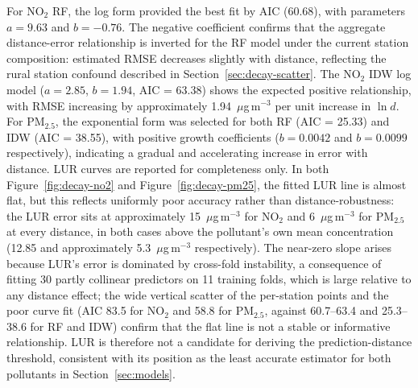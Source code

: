 \documentclass[11pt,a4paper]{article}
\begin{document}
For NO$_2$ RF, the log form provided the best fit by AIC (60.68), with parameters $a = 9.63$ and $b = -0.76$. The negative coefficient confirms that the aggregate distance-error relationship is inverted for the RF model under the current station composition: estimated RMSE decreases slightly with distance, reflecting the rural station confound described in Section~\ref{sec:decay-scatter}. The NO$_2$ IDW log model ($a = 2.85$, $b = 1.94$, AIC = 63.38) shows the expected positive relationship, with RMSE increasing by approximately 1.94~$\mu$g\,m$^{-3}$ per unit increase in $\ln d$. For PM$_{2.5}$, the exponential form was selected for both RF (AIC = 25.33) and IDW (AIC = 38.55), with positive growth coefficients ($b = 0.0042$ and $b = 0.0099$ respectively), indicating a gradual and accelerating increase in error with distance. LUR curves are reported for completeness only. In both Figure~\ref{fig:decay-no2} and Figure~\ref{fig:decay-pm25}, the fitted LUR line is almost flat, but this reflects uniformly poor accuracy rather than distance-robustness: the LUR error sits at approximately 15~$\mu$g\,m$^{-3}$ for NO$_2$ and 6~$\mu$g\,m$^{-3}$ for PM$_{2.5}$ at every distance, in both cases above the pollutant's own mean concentration (12.85 and approximately 5.3~$\mu$g\,m$^{-3}$ respectively). The near-zero slope arises because LUR's error is dominated by cross-fold instability, a consequence of fitting 30 partly collinear predictors on 11 training folds, which is large relative to any distance effect; the wide vertical scatter of the per-station points and the poor curve fit (AIC 83.5 for NO$_2$ and 58.8 for PM$_{2.5}$, against 60.7--63.4 and 25.3--38.6 for RF and IDW) confirm that the flat line is not a stable or informative relationship. LUR is therefore not a candidate for deriving the prediction-distance threshold, consistent with its position as the least accurate estimator for both pollutants in Section~\ref{sec:models}.
\end{document}
